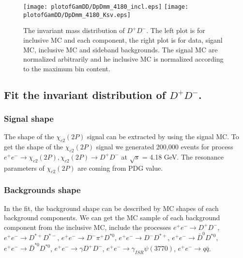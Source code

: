 \documentclass[aps,preprint,tightenlines,superscriptaddress,showpacs,byrevtex,amsmath,amssymb,nofloatfix]{revtex4}
\begin{document}
\begin{figure}[!htbp]
\captionsetup{justification=raggedright}
    \texttt{[image: plotofGamDD/DpDmm\_4180\_incl.eps]}
    \texttt{[image: plotofGamDD/DpDmm\_4180\_Ksv.eps]}

  \caption{\small The invariant mass distribution of $D^{+}D^{-}$.  The left plot is for inclusive MC and each component, the right plot is for data, siganl MC, inclusive MC and sideband backgrounds. The signal MC are normalized arbitrarily and he inclusive MC is normalized according to the maximum bin content.}
  \label{mDpDm_4180}
\end{figure}


\subsection{Fit the invariant distribution of $D^{+}D^{-}$.}

\subsubsection{Signal shape}
The shape of the $\chi_{c2}(2P)$ signal can be extracted by using the signal MC. To get the shape of the $\chi_{c2}(2P)$ signal we generated 200,000 events for process $e^{+}e^{-} \rightarrow \chi_{c2}(2P), \chi_{c2}(2P) \rightarrow D^{+}D^{-}$ at $\sqrt{s}$ = 4.18 GeV. The resonance parameters of $\chi_{c2}(2P)$ are coming from PDG value.

\subsubsection{Backgrounds shape}

In the fit, the background shape can be described by MC shapes of each background components. We can get the MC sample of each background component from the inclusive MC, include the processes $e^{+}e^{-}\rightarrow D^{+}D^{-}$, $e^{+}e^{-}\rightarrow D^{*+}D^{*-}$, $e^{+}e^{-}\rightarrow D^{-}\pi^{+}D^{*0}$, $e^{+}e^{-}\rightarrow D^{-}D^{*+}$, $e^{+}e^{-}\rightarrow \bar{D}^{0}D^{*0}$, $e^{+}e^{-}\rightarrow \bar{D}^{*0}D^{*0}$, $e^{+}e^{-}\rightarrow \gamma D^{+}D^{-}$, $e^{+}e^{-}\rightarrow \gamma_{ISR} \psi(3770)$, $e^{+}e^{-}\rightarrow q\bar{q}$.
\end{document}
